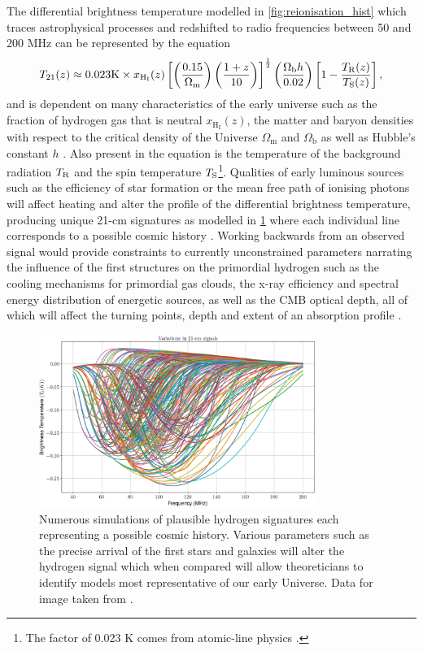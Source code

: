 The differential brightness temperature modelled in \cref{fig:reionisation_hist} which traces astrophysical processes and redshifted to radio frequencies between 50 and 200 MHz can be represented by the equation
\begin{equation}
    \label{diffBright}
    T_{\mathrm{21}} (z) \approx 0.023 \mathrm{K} \times x_{ \mathrm{H}_{\mathrm{I}} }(z) \left[ \left( \frac{0.15}{ \Omega_{\mathrm{m}} } \right) \left( \frac{ 1+z }{10} \right) \right]^{ \frac{1}{2} } \left( \frac{ \Omega_{ \mathrm{b}} h}{0.02} \right) \left[ 1 - \frac{ T_{\mathrm{R}}(z) }{ T_{\mathrm{S}}(z) } \right],
\end{equation}
and is dependent on many characteristics of the early universe such as the fraction of hydrogen gas that is neutral $x_{ \mathrm{H}_{\mathrm{I}} }(z)$, the matter and baryon densities with respect to the critical density of the Universe $\Omega_\mathrm{m}$ and $\Omega_\mathrm{b}$ as well as Hubble’s constant $h$ \citep{edgesNature}. Also present in the equation is the temperature of the background radiation $T_{\mathrm{R}}$ and the spin temperature $T_{\mathrm{S}}$\footnote{The factor of 0.023 K comes from atomic-line physics \citep{edgesNature}.}. Qualities of early luminous sources such as the efficiency of star formation or the mean free path of ionising photons will affect heating and alter the profile of the differential brightness temperature, producing unique 21-cm signatures as modelled in \cref{fig:21cm_models} where each individual line corresponds to a possible cosmic history \citep{theory_models}. Working backwards from an observed signal would provide constraints to currently unconstrained parameters narrating the influence of the first structures on the primordial hydrogen such as the cooling mechanisms for primordial gas clouds, the x-ray efficiency and spectral energy distribution of energetic sources, as well as the CMB optical depth, all of which will affect the turning points, depth and extent of an absorption profile \citep{theory_models}.
\begin{figure}
    \centering
    \includegraphics[width=0.8\textwidth]{21cm_models}
    \caption{Numerous simulations of plausible hydrogen signatures each representing a possible cosmic history. Various parameters such as the precise arrival of the first stars and galaxies will alter the hydrogen signal which when compared will allow theoreticians to identify models most representative of our early Universe. Data for image taken from \citet{theory_models}.}
    \label{fig:21cm_models}
\end{figure}


